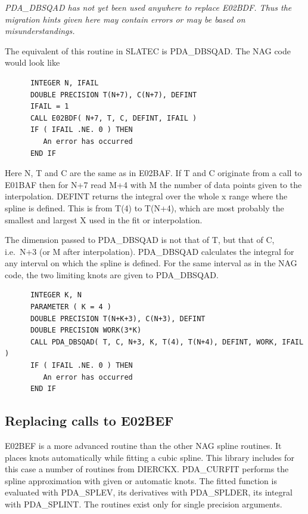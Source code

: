 \documentclass[11pt,twoside]{article}
\newcommand{\htmlref}[2]{#1}
\newcommand{\xlabel}[1]{}
\begin{document}
{\em 
   PDA\_DBSQAD has not yet been used anywhere to replace E02BDF. Thus the
   migration hints given here may contain errors or may be based on
   misunderstandings.
\/}

   The equivalent of this routine in SLATEC is
\htmlref{PDA\_DBSQAD.}{PDA\_DBSQAD}
   The NAG code
   would look like

\begin{verbatim}
      INTEGER N, IFAIL
      DOUBLE PRECISION T(N+7), C(N+7), DEFINT
      IFAIL = 1
      CALL E02BDF( N+7, T, C, DEFINT, IFAIL )
      IF ( IFAIL .NE. 0 ) THEN
         An error has occurred
      END IF
\end{verbatim}

   Here N, T and C are the same as in
\htmlref{E02BAF.}{m_e02baf}
   If T and C originate from
   a call to
\htmlref{E01BAF}{m_e01baf}
   then for N+7 read M+4 with M the number of data
   points given to the interpolation. DEFINT returns the integral over
   the whole x range where the spline is defined. This is from T(4) to
   T(N+4), which are most probably the smallest and largest X used in
   the fit or interpolation.

   The dimension passed
   to PDA\_DBSQAD is not that of T, but that of C, i.e.\ N+3 (or M after
   interpolation). PDA\_DBSQAD calculates the integral for any interval
   on which the spline is defined. For the same interval as in the NAG
   code, the two limiting knots are given to PDA\_DBSQAD.

\begin{verbatim}
      INTEGER K, N
      PARAMETER ( K = 4 )
      DOUBLE PRECISION T(N+K+3), C(N+3), DEFINT
      DOUBLE PRECISION WORK(3*K)
      CALL PDA_DBSQAD( T, C, N+3, K, T(4), T(N+4), DEFINT, WORK, IFAIL )
      IF ( IFAIL .NE. 0 ) THEN
         An error has occurred
      END IF
\end{verbatim}


\subsection{\xlabel{replacing_calls_to_e02bef}Replacing calls to E02BEF}

   E02BEF is a more advanced routine than the other NAG spline routines.
   It places knots automatically while fitting a cubic spline. This
   library includes for this case a number of routines from DIERCKX.
\htmlref{PDA\_CURFIT}{PDA\_CURFIT}
   performs the spline approximation with given or
   automatic knots. The fitted function is evaluated with
\htmlref{PDA\_SPLEV,}{PDA\_SPLEV}
   its
   derivatives with
\htmlref{PDA\_SPLDER,}{PDA\_SPLDER}
   its integral with
\htmlref{PDA\_SPLINT.}{PDA\_SPLINT}
   The routines exist
   only for single precision arguments.
\end{document}
